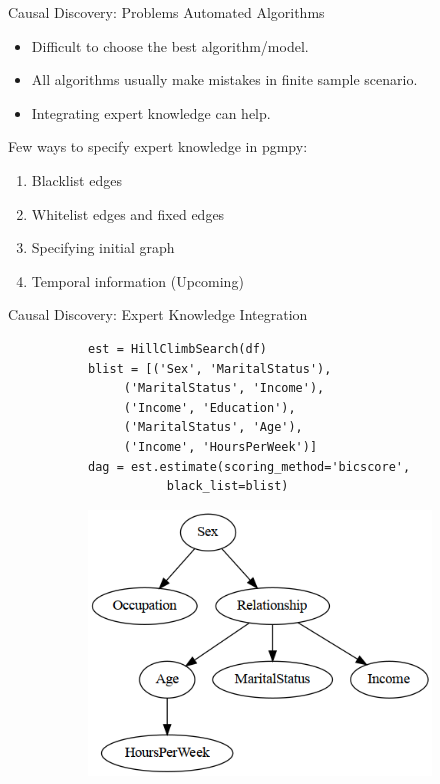 \documentclass[aspectratio=169]{beamer}
\begin{document}
\begin{frame}{Causal Discovery: Problems Automated Algorithms}
	\begin{itemize}
		\item Difficult to choose the best algorithm/model.
		\item All algorithms usually make mistakes in finite sample scenario.
		\item Integrating expert knowledge can help.
	\end{itemize}

	\vspace{2em}

	Few ways to specify expert knowledge in pgmpy:
	\begin{enumerate}
		\item Blacklist edges
		\item Whitelist edges and fixed edges
		\item Specifying initial graph
		\item Temporal information (Upcoming)
	\end{enumerate}
	
\end{frame}

\begin{frame}[fragile]{Causal Discovery: Expert Knowledge Integration}
	\begin{figure}
		\begin{subfigure}{0.6 \textwidth}
			\begin{verbatim}
est = HillClimbSearch(df)
blist = [('Sex', 'MaritalStatus'),
	 ('MaritalStatus', 'Income'),
	 ('Income', 'Education'),
	 ('MaritalStatus', 'Age'),
	 ('Income', 'HoursPerWeek')]
dag = est.estimate(scoring_method='bicscore',
		   black_list=blist)
			\end{verbatim}
		\end{subfigure}%
		\begin{subfigure}{0.4 \textwidth}
			\centering
			\includegraphics[scale=0.3]{imgs/adult_bic_blacklist.png}
		\end{subfigure}
	\end{figure}
\end{frame}
\end{document}
